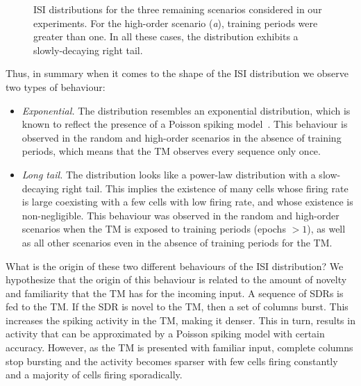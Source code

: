 \documentclass[11pt,letterpaper]{article}
\begin{document}
\begin{figure}[t]
{				    \label{fig17:c}
			    }			    
			    \caption{
			        ISI distributions for the three remaining scenarios considered in our experiments.
			        For the high-order scenario (\emph{a}), training periods were greater than one.
			        In all these cases, the distribution exhibits a slowly-decaying right tail.
			    }
			    \label{fig17}
		    \end{figure}		    
		    
            Thus, in summary when it comes to the shape of the ISI distribution we observe two types of behaviour:
            \begin{itemize}
                \item\emph{Exponential.} The distribution resembles an exponential distribution, which is known to
                reflect the presence of a Poisson spiking model~\cite{heeger2000poisson}. This behaviour is observed
                in the random and high-order scenarios in the absence of training periods, which means that 
                the TM observes every sequence only once.
                \item\emph{Long tail.} The distribution looks like a power-law distribution with a slow-decaying
                right tail. This implies the existence of many cells whose firing rate is large coexisting with
                a few cells with low firing rate, and whose existence is non-negligible.
                This behaviour was observed in the random and high-order scenarios when the TM is exposed to training periods
                (epochs $> 1$), as well as all other scenarios even in the absence of training periods for the TM.
            \end{itemize}
            
            What is the origin of these two different behaviours of the ISI distribution?
            We hypothesize that the origin of this behaviour is related to the amount of novelty and
            familiarity that the TM has for the incoming input.
            A sequence of SDRs is fed to the TM.
            If the SDR is novel to the TM, then a set of columns burst.
            This increases the spiking activity in the TM, making it denser.
            This in turn, results in activity that can be approximated by a Poisson spiking model
            with certain accuracy.
            However, as the TM is presented with familiar input, complete columns stop bursting
            and the activity becomes sparser with few cells firing constantly and a majority of cells
            firing sporadically.
            
\end{document}
